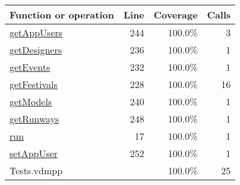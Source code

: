 \bigskip
\begin{longtable}{|l|r|r|r|}
\hline
Function or operation & Line & Coverage & Calls \\
\hline
\hline
\hyperref[getAppUsers:244]{getAppUsers} & 244&100.0\% & 3 \\
\hline
\hyperref[getDesigners:236]{getDesigners} & 236&100.0\% & 1 \\
\hline
\hyperref[getEvents:232]{getEvents} & 232&100.0\% & 1 \\
\hline
\hyperref[getFestivals:228]{getFestivals} & 228&100.0\% & 16 \\
\hline
\hyperref[getModels:240]{getModels} & 240&100.0\% & 1 \\
\hline
\hyperref[getRunways:248]{getRunways} & 248&100.0\% & 1 \\
\hline
\hyperref[run:17]{run} & 17&100.0\% & 1 \\
\hline
\hyperref[setAppUser:252]{setAppUser} & 252&100.0\% & 1 \\
\hline
\hline
Tests.vdmpp & & 100.0\% & 25 \\
\hline
\end{longtable}

